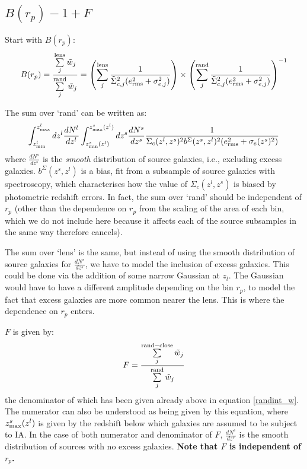 \documentclass[onecolumn,amsmath,aps,fleqn, superscriptaddress]{revtex4}
\begin{document}
\subsection*{$B(r_p)-1+F$}

Start with $B(r_p)$:
\begin{equation}
B(r_p) = \frac{\sum\limits_{j}^{\rm lens}\tilde{w}_j}{\sum\limits_{j}^{\rm rand} \tilde{w}_j} = \left(\sum\limits_{j}^{\rm lens} \frac{1}{\tilde{\Sigma}_{c,j}^2 (e_{\rm rms}^2 + \sigma_{e,j}^2)}\right) \times \left(\sum\limits_{j}^{\rm rand} \frac{1}{\tilde{\Sigma}_{c,j}^2 (e_{\rm rms}^2 + \sigma_{e,j}^2)}\right)^{-1}
\label{boost}
\end{equation}

The sum over `rand' can be written as:
\begin{equation}
\int_{z^l_{\rm min}}^{z^l_{\rm max}}dz^l \frac{dN^l}{dz^l} \int_{z^s_{\rm min}(z^l)}^{z^s_{\rm max}(z^l)}dz^s \frac{dN^s}{dz^s} \frac{1}{\Sigma_c(z^l , z^s)^2 b^{\Sigma}(z^s,z^l)^2 (e_{\rm rms}^2 + \sigma_e(z^s)^2)}
\label{randint_w}
\end{equation}
where $\frac{dN^s}{dz^s}$ is the {\it smooth} distribution of source galaxies, i.e., excluding excess galaxies. $b^{\Sigma}(z^s,z^l)$ is a bias, fit from a subsample of source galaxies with spectroscopy, which characterises how the value of $\Sigma_c(z^l , z^s)$ is biased by photometric redshift errors. In fact, the sum over `rand' should be independent of $r_p$ (other than the dependence on $r_p$ from the scaling of the area of each bin, which we do not include here because it affects each of the source subsamples in the same way therefore cancels).

The sum over `lens' is the same, but instead of using the smooth distribution of source galaxies for $\frac{dN^s}{dz^s}$, we have to model the inclusion of excess galaxies. This could be done via the addition of some narrow Gaussian at $z_l$. The Gaussian would have to have a different amplitude depending on the bin $r_p$, to model the fact that excess galaxies are more common nearer the lens. This is where the dependence on $r_p$ enters.

$F$ is given by:
\begin{equation}
F= \frac{\sum\limits_{j}^{\rm rand-close}\tilde{w}_j}{\sum\limits_{j}^{\rm rand} \tilde{w}_j} 
\label{F}
\end{equation}
the denominator of which has been given already above in equation \ref{randint_w}. The numerator can also be understood as being given by this equation, where $z^s_{\rm max}(z^l)$ is given by the redshift below which galaxies are assumed to be subject to IA. In the case of both numerator and denominator of $F$, $\frac{dN^s}{dz^s}$ is the smooth distribution of sources with no excess galaxies. {\bf Note that $F$ is independent of $r_p$.}
\end{document}
